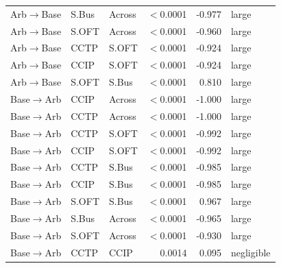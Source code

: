 \begin{table}[ht]
\begin{tabular}{lllrrl}
Arb$\to$Base & S.Bus & Across & $<$0.0001 & -0.977 & large \\
Arb$\to$Base & S.OFT & Across & $<$0.0001 & -0.960 & large \\
Arb$\to$Base & CCTP & S.OFT & $<$0.0001 & -0.924 & large \\
Arb$\to$Base & CCIP & S.OFT & $<$0.0001 & -0.924 & large \\
Arb$\to$Base & S.OFT & S.Bus & $<$0.0001 & 0.810 & large \\
\midrule
Base$\to$Arb & CCIP & Across & $<$0.0001 & -1.000 & large \\
Base$\to$Arb & CCTP & Across & $<$0.0001 & -1.000 & large \\
Base$\to$Arb & CCTP & S.OFT & $<$0.0001 & -0.992 & large \\
Base$\to$Arb & CCIP & S.OFT & $<$0.0001 & -0.992 & large \\
Base$\to$Arb & CCTP & S.Bus & $<$0.0001 & -0.985 & large \\
Base$\to$Arb & CCIP & S.Bus & $<$0.0001 & -0.985 & large \\
Base$\to$Arb & S.OFT & S.Bus & $<$0.0001 & 0.967 & large \\
Base$\to$Arb & S.Bus & Across & $<$0.0001 & -0.965 & large \\
Base$\to$Arb & S.OFT & Across & $<$0.0001 & -0.930 & large \\
Base$\to$Arb & CCTP & CCIP & 0.0014 & 0.095 & negligible \\
\bottomrule
\end{tabular}
\endgroup
\end{table}

